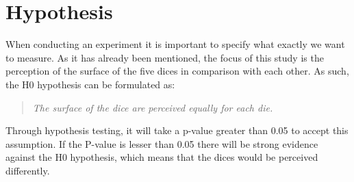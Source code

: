 \section{Hypothesis}
\label{Hypothesis}
When conducting an experiment it is important to specify what exactly we want to measure. As it has already been mentioned, the focus of this study is the perception of the surface of the five dices in comparison with each other. As such, the H0 hypothesis can be formulated as:

\begin{quote}
	\textit{The surface of the dice are perceived equally for each die.} 
\end{quote}

\noindent
Through hypothesis testing, it will take a p-value greater than 0.05 to accept this assumption. If the P-value is lesser than 0.05 there will be strong evidence against the H0 hypothesis, which means that the dices would be perceived differently.

